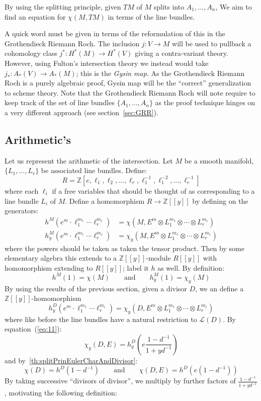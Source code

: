 \documentclass{book}
\newcommand{\Z}{{\mathbb{Z}}}
\newcommand{\CL}{{\mathcal{L}}}
\begin{document}
By using the splitting principle, given $TM$ of $M$ splits into $A_1, ..., A_n$, We aim to find an equation
for $\chi(M, TM)$ in terms of the line bundles.

A quick word must be given in terms of the reformulation of this in the Grothendieck Riemann Roch. The
inclusion $j: V \to M$ will be used to pullback a cohomology class $j^*: H^*(M) \to H^*(V)$ giving
a contra-variant theory. However, using Fulton's intersection theory we instead would take $j_*: A_*(V) \to
A_*(M)$; this is the \emph{Gysin map}. As the Grothendieck Riemann Roch is a purely algebraic proof, Gysin map
will be the ``correct'' generalization to scheme theory. Note that the Grothendieck Riemann Roch will note
require to keep track of the set of line bundles $\{A_1, ..., A_n\}$ as the proof technique hinges on
a very different approach (see section~\ref{sec:GRR}).

%

\subsection{Arithmetic's}

Let us represent the arithmetic of the intersection. Let $M$ be a smooth manifold, $\{L_1, ..., L_r\}$ be
associated line bundles. Define:
\[
  R = \Z[e, \ell_1, \ell_2, ..., \ell_r, \ell_1^{-1}, \ell_1^{-2}, ...,\ell_r^{-1}]
\]
where each $\ell_i$ if a free variables that should be thought of as  corresponding to a line bundle $L_i$ of
$M$. Define a homomorphism $R \to \Z[[y]]$ by defining on the generators:
\begin{align*}
  h^M(e^{m}\cdot \ell_1^{m_1}\cdots \ell_r^{m_r}) &= \chi(M, E^{m} \otimes L_1^{m_1}\otimes \cdots \otimes L_r^{m_r})\\
  h_y^M(e^{m}\cdot \ell_1^{m_1}\cdots \ell_r^{m_r}) &= \chi_y(M, E^{m} \otimes L_1^{m_1}\otimes \cdots \otimes L_r^{m_r})
\end{align*}
where the powers should be taken as taken the tensor product. Then by some elementary algebra this extends to
a $\Z[[y]]$-module $R[[y]]$ with homomorphism extending to $R[[y]]$; label it $h$ as well. By definition:
\[
  h^M(1) = \chi(M) \qquad \text{and} \qquad h_y^M(1) = \chi_y(M)
\]
By using the results of the previous section, given a divisor $D$, we an define a $\Z[[y]]$-homomorphism
\[
  h_y^D(e^{m}\cdot \ell_1^{m_1}\cdots \ell_r^{m_r}) = \chi_y(D, E^{m} \otimes L_1^{m_1}\otimes \cdots \otimes
  L_r^{m_r})
\]
where like before the line bundles have a natural restriction to $\CL(D)$. By equation~(\ref{eq:11}):
\[
  \chi_y(D, E) = h_y^D \left(e\frac{1-d^{-1}}{1+yd^{-1}}\right)
\]
and by~\cref{th:splitPrinEulerCharAndDivisor}:
\[
  \chi(D) = h^D(1-d^{-1}) \qquad \text{and} \qquad \chi(D, E) = h^D(e(1- d^{-1}))
\]
By taking successive ``divisors of divisor'', we multiply by further factors of $\frac{1-d^{-1}}{1+yd^{-1}}$,
motivating the following definition:
\end{document}
